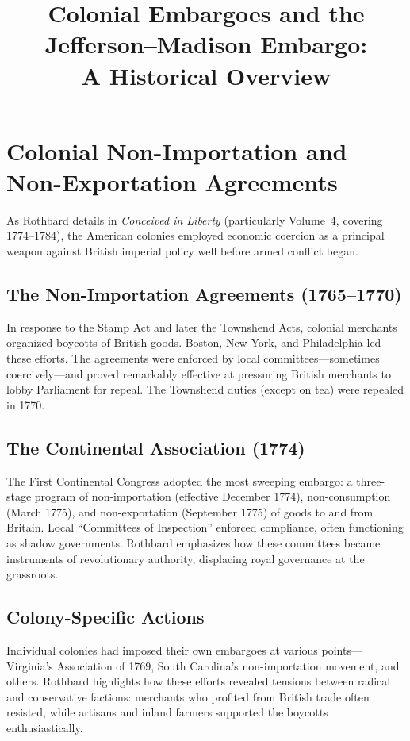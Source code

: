 \documentclass[12pt]{article}
\title{Colonial Embargoes and the Jefferson--Madison Embargo:\\
A Historical Overview}
\author{}
\date{}
\begin{document}
\maketitle

\section{Colonial Non-Importation and Non-Exportation Agreements}

As Rothbard details in \emph{Conceived in Liberty} (particularly Volume~4,
covering 1774--1784), the American colonies employed economic coercion as a
principal weapon against British imperial policy well before armed conflict
began.

\subsection{The Non-Importation Agreements (1765--1770)}

In response to the Stamp Act and later the Townshend Acts, colonial merchants
organized boycotts of British goods. Boston, New York, and Philadelphia led
these efforts. The agreements were enforced by local committees---sometimes
coercively---and proved remarkably effective at pressuring British merchants to
lobby Parliament for repeal. The Townshend duties (except on tea) were repealed
in 1770.

\subsection{The Continental Association (1774)}

The First Continental Congress adopted the most sweeping embargo: a three-stage
program of non-importation (effective December 1774), non-consumption (March
1775), and non-exportation (September 1775) of goods to and from Britain. Local
``Committees of Inspection'' enforced compliance, often functioning as shadow
governments. Rothbard emphasizes how these committees became instruments of
revolutionary authority, displacing royal governance at the grassroots.

\subsection{Colony-Specific Actions}

Individual colonies had imposed their own embargoes at various points---Virginia's
Association of 1769, South Carolina's non-importation movement, and others.
Rothbard highlights how these efforts revealed tensions between radical and
conservative factions: merchants who profited from British trade often resisted,
while artisans and inland farmers supported the boycotts enthusiastically.
\end{document}
